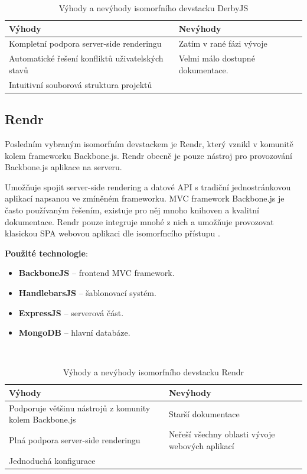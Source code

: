 \begin{table}[h]
\centering
	\caption{Výhody a nevýhody isomorfního devstacku DerbyJS \cite{isomorphic_pimentel}}
	\begin{tabular}{ |C{5cm}|C{5cm}| }
	\hline
	Výhody & Nevýhody \\ \hline
	Kompletní podpora server-side renderingu & Zatím v rané fázi vývoje \\ \hline
   Automatické řešení konfliktů uživatelských stavů & Velmi málo dostupné dokumentace.\\ \hline
	Intuitivní souborová struktura projektů & \\ \hline
    \end{tabular}
	\label{tab:proscons_este}
\end{table}
\FloatBarrier

\subsection{Rendr}
Posledním vybraným isomorfním devstackem je Rendr, který vznikl v komunitě kolem frameworku Backbone.js. Rendr obecně je pouze nástroj pro provozování Backbone.js aplikace na serveru. 

Umožňuje spojit server-side rendering a datové API s tradiční jednostránkovou aplikací napsanou ve zmíněném frameworku. MVC framework Backbone.js je často používaným řešením, existuje pro něj mnoho knihoven a kvalitní dokumentace. Rendr pouze integruje mnohé z nich a umožňuje provozovat klasickou SPA webovou aplikaci dle isomorfncího přístupu \cite{isomorphic_pimentel} \cite{rendrjs}.

\vspace{0,3cm}
\noindent\textbf{Použité technologie}:
\begin{itemize}
\item \textbf{BackboneJS} – frontend MVC framework.
\item \textbf{HandlebarsJS} – šablonovací systém.
\item \textbf{ExpressJS} – serverová část.
\item \textbf{MongoDB} – hlavní databáze.
\end{itemize}

\pagebreak
~
\begin{table}[h]
\centering
	\caption{Výhody a nevýhody isomorfního devstacku Rendr \cite{isomorphic_pimentel}}
	\begin{tabular}{ |C{5cm}|C{5cm}| }
	\hline
	Výhody & Nevýhody \\ \hline
	Podporuje většinu nástrojů z komunity kolem Backbone.js & Starší dokumentace \\ \hline
	Plná podpora server-side renderingu & Neřeší všechny oblasti vývoje webových aplikací \\ \hline
    Jednoduchá konfigurace & \\ \hline
    \end{tabular}
	\label{tab:proscons_rendr}
\end{table}